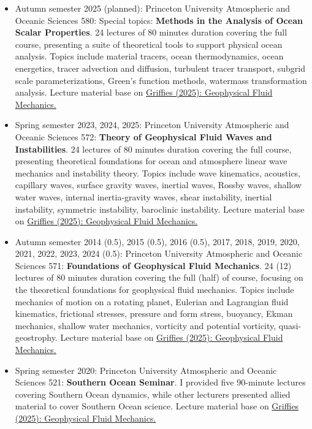 \documentclass{article}
\begin{document}
\begin{itemize}[leftmargin=*]

\item Autumn semester 2025 (planned): Princeton University Atmospheric and Oceanic Sciences 580: Special topics: {\bf Methods in the Analysis of Ocean Scalar Properties}. 24 lectures of 80 minutes duration covering the full course, presenting a suite of theoretical tools to support physical ocean analysis. Topics include material tracers, ocean thermodynamics, ocean energetics, tracer advection and diffusion, turbulent tracer transport, subgrid scale parameterizations, Green's function methods, watermass transformation analysis. Lecture material base on \href{https://stephengriffies.github.io/assets/pdfs/GFM_lectures.pdf}{Griffies (2025): Geophysical Fluid Mechanics.}

\item Spring semester 2023, 2024, 2025: Princeton University Atmospheric and Oceanic Sciences 572: {\bf Theory of Geophysical Fluid Waves and Instabilities}. 24 lectures of 80 minutes duration covering the full course, presenting theoretical foundations for ocean and atmosphere linear wave mechanics and instability theory. Topics include wave kinematics, acoustics, capillary waves, surface gravity waves, inertial waves, Rossby waves, shallow water waves, internal inertia-gravity waves, shear instability, inertial instability, symmetric instability, baroclinic instability. Lecture material base on \href{https://stephengriffies.github.io/assets/pdfs/GFM_lectures.pdf}{Griffies (2025): Geophysical Fluid Mechanics.}

\item Autumn semester 2014 (0.5), 2015 (0.5), 2016 (0.5), 2017, 2018, 2019, 2020, 2021, 2022, 2023, 2024 (0.5): Princeton University Atmospheric and Oceanic Sciences 571: {\bf  Foundations of Geophysical Fluid Mechanics}. 24 (12) lectures of 80 minutes duration covering the full (half) of course, focusing on the theoretical foundations for geophysical fluid mechanics. Topics include mechanics of motion on a rotating planet, Eulerian and Lagrangian fluid kinematics, frictional stresses, pressure and form stress, buoyancy, Ekman mechanics, shallow water mechanics, vorticity and potential vorticity, quasi-geostrophy. Lecture material base on \href{https://stephengriffies.github.io/assets/pdfs/GFM_lectures.pdf}{Griffies (2025): Geophysical Fluid Mechanics.}

\item Spring semester 2020: Princeton University Atmospheric and Oceanic Sciences 521: {\bf Southern Ocean Seminar}. I provided five 90-minute lectures covering Southern Ocean dynamics, while other lecturers presented allied material to cover Southern Ocean science.  Lecture material base on \href{https://stephengriffies.github.io/assets/pdfs/GFM_lectures.pdf}{Griffies (2025): Geophysical Fluid Mechanics.} 


\end{itemize}
\end{document}
